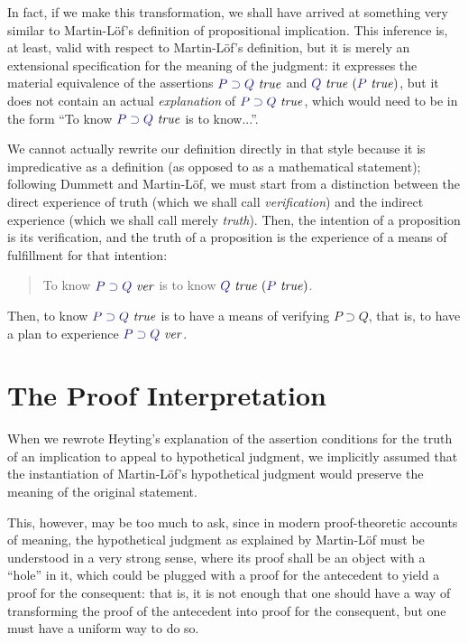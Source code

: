 \documentclass[11pt]{amsart}
\theoremstyle{definition}
\theoremstyle{remark}
\numberwithin{equation}{section}
\def\InputModeColorName{MidnightBlue}
\newcommand\InputMode[1]{{\color{\InputModeColorName}{#1}}}
\newcommand\HypJ[2]{#1\ (#2)}
\newcommand\IsVer[1]{\InputMode{#1}\ \mathit{ver}}
\newcommand\IsTrue[1]{\InputMode{#1}\ \mathit{true}}
\newcommand\Imp[2]{#1\supset #2}
\begin{document}
In fact, if we make this transformation, we shall have arrived at something very
similar to Martin-L\"of's definition of propositional implication. This
inference is, at least, valid with respect to Martin-L\"of's definition, but it
is merely an extensional specification for the meaning of the judgment: it
expresses the material equivalence of the assertions $\IsTrue{\Imp{P}{Q}}$ and
$\HypJ{\IsTrue{Q}}{\IsTrue{P}}$, but it does not contain an actual
\emph{explanation} of $\IsTrue{\Imp{P}{Q}}$, which would need to be in the form ``To
know $\IsTrue{\Imp{P}{Q}}$ is to know...''.

We cannot actually rewrite our definition directly in that style because it is
impredicative as a definition (as opposed to as a mathematical statement);
following Dummett \cite{Dummett:Elements} and Martin-L\"of, we must start from a
distinction between the direct experience of truth (which we shall call
\emph{verification}) and the indirect experience (which we shall call merely
\emph{truth}). Then, the intention of a proposition is its verification, and the
truth of a proposition is the experience of a means of fulfillment for that
intention:

\begin{quote}
  To know $\IsVer{\Imp{P}{Q}}$ is to know $\HypJ{\IsTrue{Q}}{\IsTrue{P}}$.
\end{quote}

Then, to know $\IsTrue{\Imp{P}{Q}}$ is to have a means of verifying $\Imp{P}{Q}$, that
is, to have a plan to experience $\IsVer{\Imp{P}{Q}}$.

\section{The Proof Interpretation}

When we rewrote Heyting's explanation of the assertion conditions for the truth
of an implication to appeal to hypothetical judgment, we implicitly assumed that
the instantiation of Martin-L\"of's hypothetical judgment would preserve the
meaning of the original statement.

This, however, may be too much to ask, since in modern proof-theoretic accounts
of meaning, the hypothetical judgment as explained by Martin-L\"of must be
understood in a very strong sense, where its proof shall be an object with a
``hole'' in it, which could be plugged with a proof for the antecedent to yield
a proof for the consequent: that is, it is not enough that one should have a way
of transforming the proof of the antecedent into proof for the consequent, but
one must have a uniform way to do so.
\end{document}
